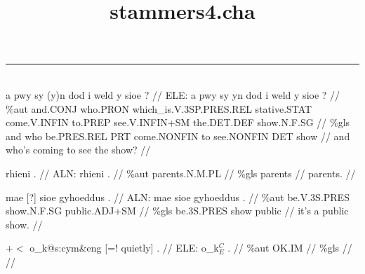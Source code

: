 \documentclass[a4paper,10pt]{article}
\title{stammers4.cha}
\author{}
\date{}
\begin{document}
\maketitle

\renewcommand{\abstractname}{Conversation details}


\rule{\linewidth}{0.2mm}\\[0.5cm]

\ex
\begingl[lingstyle=gergl]
\glchat a pwy sy (y)n dod i weld y sioe ? //
\glsurface ELE:  a pwy sy yn dod i weld y sioe ?  //
\glauto \%aut  and{\scriptsize .CONJ} who{\scriptsize .PRON} which\_is{\scriptsize .V.3SP.PRES.REL} stative{\scriptsize .STAT} come{\scriptsize .V.INFIN} to{\scriptsize .PREP} see{\scriptsize .V.INFIN+SM} the{\scriptsize .DET.DEF} show{\scriptsize .N.F.SG}   //
\glmanual \%gls  and who be{\scriptsize .PRES.REL} PRT come{\scriptsize .NONFIN} to see{\scriptsize .NONFIN} DET show   //
\gleng and who's coming to see the show? //
\endgl
\xe

\ex
\begingl[lingstyle=gergl]
\glchat rhieni . //
\glsurface ALN:  rhieni .  //
\glauto \%aut  parents{\scriptsize .N.M.PL}   //
\glmanual \%gls  parents   //
\gleng parents. //
\endgl
\xe

\ex
\begingl[lingstyle=gergl]
\glchat mae [?] sioe gyhoeddus . //
\glsurface ALN:  mae sioe gyhoeddus .  //
\glauto \%aut  be{\scriptsize .V.3S.PRES} show{\scriptsize .N.F.SG} public{\scriptsize .ADJ+SM}   //
\glmanual \%gls  be{\scriptsize .3S.PRES} show public   //
\gleng it's a public show. //
\endgl
\xe

\ex
\begingl[lingstyle=gergl]
\glchat +$<$ o\_k@s:cym\&eng [=! quietly] . //
\glsurface ELE:  o\_k$^{C}_{E}$ .  //
\glauto \%aut  OK{\scriptsize .IM}   //
\glmanual \%gls     //
\gleng  //
\endgl
\xe
\end{document}
